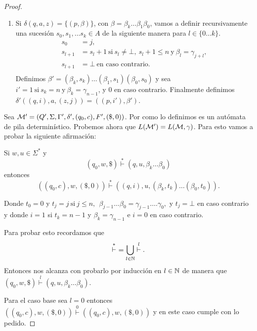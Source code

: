 \documentclass[tesis.tex]{subfiles}
\begin{document}
\begin{proof}
\begin{enumerate}
		\item Si $\delta(q,a,z) = \{(p,\beta)\}$, con $\beta = \beta_k \dots \beta_1 \beta_0$, vamos a definir recursivamente una sucesión $s_0, s_1, \dots s_k \in A$ de la siguiente manera para $l \in \{0 \dots k\}$.
		\begin{align*}
			s_0 &= j,  \\
			s_{l+1} &= s_{l}+1 \ \text{si} \ s_l \neq \bot,  \ s_{l}+1 \le n \ \text{y} \ \beta_l = \gamma_{j+l}, \\
			s_{l+1} &= \bot \ \text{en caso contrario}. \\
		\end{align*}
		Definimos $\beta' = (\beta_k, s_k)\dots(\beta_1,s_1)(\beta_0,s_0)$ y sea $i' = 1 \ \text{si} \ s_k=n \ \text{y} \ \beta_k=\gamma_{n-1}$, y $0$ en caso contrario.
		Finalmente definimos $\delta'((q,i), a, (z,j)) = {((p,i'),\beta')}$.
	\end{enumerate}

	Sea ${\cal{M'}} = (Q', \Sigma, \Gamma', \delta', (q_{0},c), F', (\$,0))$.
	Por como lo definimos es un autómata de pila determinístico.
	Probemos ahora que $L({\cal M}') = L({\cal M}, \gamma)$.
	Para esto vamos a probar la siguiente afirmación:

	\begin{aff}
		Si $w,u \in \Sigma^{*}$ y 	 
	\[
		(q_{0}, w, \$) \overset{*}{\vdash} (q, u, \beta_k \dots  \beta_0)
	\]
		\quad \quad entonces
	\[
		((q_0,c), w, (\$,0)) \overset{*}{\vdash} ((q,i), u, (\beta_k, t_k)\dots (\beta_0,t_0)).
	\] 

	Donde $t_0 = 0$ y 
	$t_j = j \ \text{si} \ j \le n, \ \ \beta_{j-1}\dots \beta_0 = \gamma_{j-1}\dots  .\gamma_0,$ y $t_{j} = \bot$ en caso contrario y donde $i = 1$ si $t_{k} = n-1$ y $\beta_{k} = \gamma_{n-1}$ e $i=0$ en caso contrario.
	\end{aff}	
	


	Para probar esto recordamos que
	\[
		\overset{*}{\vdash} \ = \underset{l \in \mathbb{N}}{\bigcup} \overset{l}{\vdash}.
	\]
	Entonces nos alcanza con probarlo por inducción en $l \in \mathbb{N}$ de manera que $(q_{0}, w, \$) \overset{l}{\vdash} (q, u, \beta_k \dots  \beta_0)$.

	Para el caso base sea $l = 0$ entonces 
	$((q_{0},c), w, (\$,0)) \overset{0}{\vdash} ((q_{0},c), w, (\$,0))$ 
	y en este caso cumple con lo pedido.


\end{proof}
\end{document}
